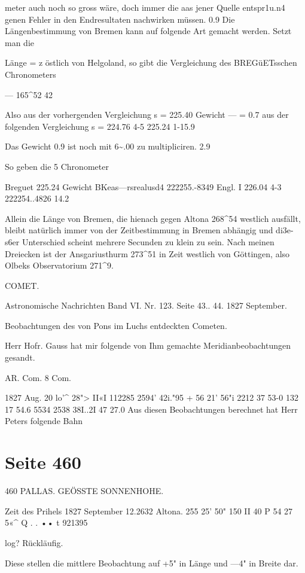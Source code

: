 \documentclass[10pt,a4paper]{article}
\begin{document}
meter auch noch so gross wäre, doch immer die aas jener Quelle entspr1u.n4 genen Fehler in den Endresultaten nachwirken müssen. 0.9 Die Längenbestimmung von Bremen kann auf folgende Art gemacht werden. Setzt man die

Länge = z östlich von Helgoland, so gibt die Vergleichung des BREGüETsschen Chronometers

— 165\textasciicircum{}52 42

Also aus der vorhergenden Vergleichung s = 225.40 Gewicht — = 0.7 aus der folgenden Vergleichung s = 224.76 4-5 225.24 1-15.9

Das Gewicht 0.9 ist noch mit 6\textasciitilde{}.00 zu multipliciren. 2.9

So geben die 5 Chronometer

Breguet 225.24 Gewicht BKeas—rsrealusd4 222255.-8349 Engl. I 226.04 4-3 222254..4826 14.2

Allein die Länge von Bremen, die hienach gegen Altona 268\textasciicircum{}54 westlich ausfällt, bleibt natürlich immer von der Zeitbestimmung in Bremen abhängig und di3e-s6er Unterschied scheint mehrere Secunden zu klein zu sein. Nach meinen Dreiecken ist der Ansgariusthurm 273\textasciicircum{}51 in Zeit westlich von Göttingen, also Olbeks Observatorium 271\textasciicircum{}9.

COMET.

Astronomische Nachrichten Band VI. Nr. 123. Seite 43.. 44. 1827 September.

Beobachtungen des von Pons im Luchs entdeckten Cometen.

Herr Hofr. Gauss hat mir folgende von Ihm gemachte Meridianbeobachtungen gesandt.

AR. Com. 8 Com.

1827 Aug. 20 lo'\textasciicircum{} 28"> II«I 112285\textdegree{} 2594' 42i."95 + 56\textdegree{} 21' 56"i 2212 37 53-0 132 17 54.6 5534 2538 38I..2I 47 27.0 Aus diesen Beobachtungen berechnet hat Herr Peters folgende Bahn


\newpage
\section*{Seite 460}
460 PALLAS. GEÖSSTE SONNENHOHE.

Zeit des Prihels 1827 September 12.2632 Altona. 255\textdegree{} 25' 50" 150 II 40 P 54 27 5«\textasciicircum{} Q . . •• t 921395

log? Rückläufig.

Diese stellen die mittlere Beobachtung auf +5" in Länge und —4" in Breite dar.
\end{document}

